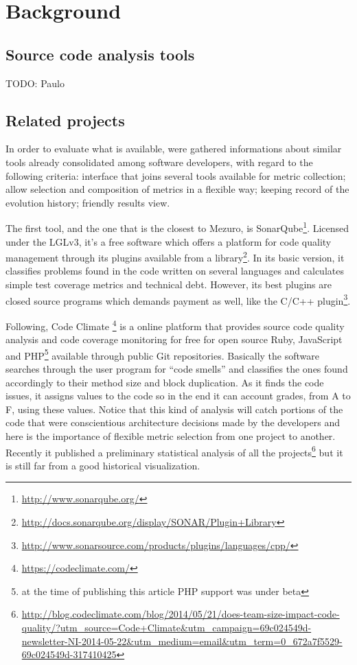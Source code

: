 \section{Background}
\label{sec:background}

\subsection{Source code analysis tools}
\label{subsec:related-tools}

TODO: Paulo

\subsection{Related projects}
\label{subsec:related-projects}

In order to evaluate what is available, were gathered informations about similar tools already consolidated among software developers, with regard to the following criteria: interface that joins several tools available for metric collection; allow selection and composition of metrics in a flexible way; keeping record of the evolution history; friendly results view.

The first tool, and the one that is the closest to Mezuro, is SonarQube\footnote{\url{http://www.sonarqube.org/}}. Licensed under the LGLv3, it's a free software which offers a platform for code quality management through its plugins available from a library\footnote{\url{http://docs.sonarqube.org/display/SONAR/Plugin+Library}}. In its basic version, it classifies problems found in the code written on several languages and calculates simple test coverage metrics and technical debt. However, its best plugins are closed source programs which demands payment as well, like the C/C++ plugin\footnote{\url{http://www.sonarsource.com/products/plugins/languages/cpp/}}.

Following, Code Climate \footnote{\url{https://codeclimate.com/}} is a online platform that provides source code quality analysis and code coverage monitoring for free for open source Ruby, JavaScript and PHP\footnote{at the time of publishing this article PHP support was under beta} available through public Git repositories. Basically the software searches through the user program for ``code smells'' and classifies the ones found accordingly to their method size and block duplication. As it finds the code issues, it assigns values to the code so in the end it can account grades, from A to F, using these values. Notice that this kind of analysis will catch portions of the code that were conscientious architecture decisions made by the developers and here is the importance of flexible metric selection from one project to another. Recently it published a preliminary statistical analysis of all the projects\footnote{\url{http://blog.codeclimate.com/blog/2014/05/21/does-team-size-impact-code-quality/?utm_source=Code+Climate&utm_campaign=69c024549d-newsletter-NI-2014-05-22&utm_medium=email&utm_term=0_672a7f5529-69c024549d-317410425}} but it is still far from a good historical visualization.

